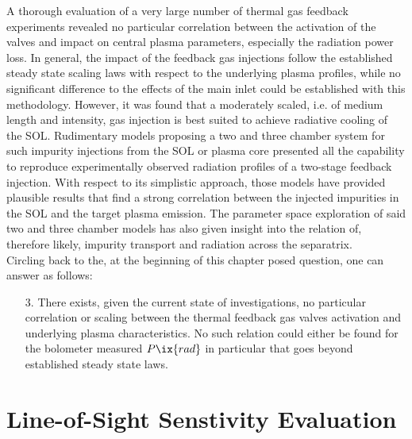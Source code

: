 %
        \newline%
        A thorough evaluation of a very large number of thermal gas feedback experiments revealed no particular correlation between the activation of the valves and impact on central plasma parameters, especially the radiation power loss. In general, the impact of the feedback gas injections follow the established steady state scaling laws with respect to the underlying plasma profiles, while no significant difference to the effects of the main inlet could be established with this methodology. However, it was found that a moderately scaled, i.e. of medium length and intensity, gas injection is best suited to achieve radiative cooling of the SOL. Rudimentary models proposing a two and three chamber system for such impurity injections from the SOL or plasma core presented all the capability to reproduce experimentally observed radiation profiles of a two-stage feedback injection. With respect to its simplistic approach, those models have provided plausible results that find a strong correlation between the injected impurities in the SOL and the target plasma emission. The parameter space exploration of said two and three chamber models has also given insight into the relation of, therefore likely, impurity transport and radiation across the separatrix.\\%
        Circling back to the, at the beginning of this chapter posed question, one can answer as follows:%

        \begin{enumerate}%
            \item[3.]{%
            There exists, given the current state of investigations, no particular correlation or scaling between the thermal feedback gas valves activation and underlying plasma characteristics. No such relation could either be found for the bolometer measured $P\ix{rad}$ in particular that goes beyond established steady state laws.}%
        \end{enumerate}%

    \section{Line-of-Sight Senstivity Evaluation}%
%
